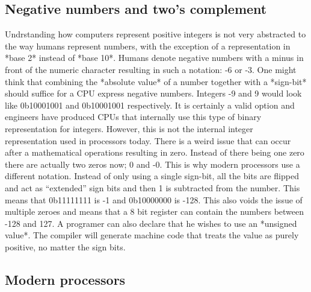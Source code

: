 \subsection{Negative numbers and two's complement}

Undrstanding how computers represent positive integers is not very abstracted to the way humans
represent numbers, with the exception of a representation in *base 2* instead of *base 10*. Humans
denote negative numbers with a minus in front of the numeric character resulting in such a notation: 
-6 or -3. One might think that combining the *absolute value* of a number together with a *sign-bit*
should suffice for a CPU express negative numbers. Integers -9 and 9 would look like 0b10001001 and
0b10001001 respectively. It is certainly a valid option and engineers have produced
CPUs that internally use this type of binary representation for integers. However, this is not the 
internal integer representation used in processors today. There is a weird issue that can occur after
a mathematical operations resulting in zero. Instead of there being one zero there are actually two 
zeros now; 0 and -0. This is why modern processors use a different notation. Instead of only using a
single sign-bit, all the bits are flipped and act as “extended” sign bits and then 1 is subtracted 
from the number. This means that 0b11111111 is -1 and 0b10000000 is -128. This also voids the issue 
of multiple zeroes and means that a 8 bit register can contain the numbers between -128 and 127. 
A programer can also declare that he wishes to use an *unsigned value*. The compiler will generate
machine code that treats the value as purely positive, no matter the sign bits.


\subsection{Modern processors}

